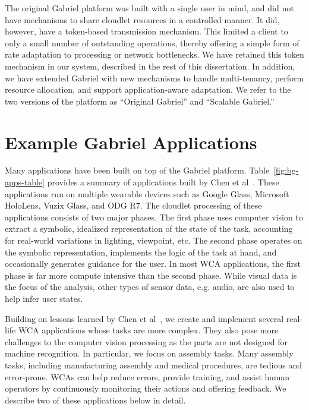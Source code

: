 The original Gabriel platform was built with a single user in mind, and did not
have mechanisms to share cloudlet resources in a controlled manner.  It did,
however, have a token-based transmission mechanism.  This limited a client to
only a small number of outstanding operations, thereby offering a simple form of
rate adaptation to processing or network bottlenecks.  We have retained this
token mechanism in our system, described in the rest of this dissertation. In
addition, we have extended Gabriel with new mechanisms to handle multi-tenancy,
perform resource allocation, and support application-aware adaptation.  We refer
to the two versions of the platform as ``Original Gabriel'' and ``Scalable
Gabriel.''

\section{Example Gabriel Applications}
\label{sec:example-apps}

Many applications have been built on top of the Gabriel platform.
Table~\ref{fig:bg-apps-table} provides a summary of applications built by Chen
et al~\cite{chen2018application}. These applications run on multiple wearable
devices such as Google Glass, Microsoft HoloLens, Vuzix Glass, and ODG R7. The
cloudlet processing of these applications consists of two major phases. The
first phase uses computer vision to extract a symbolic, idealized representation
of the state of the task, accounting for real-world variations in lighting,
viewpoint, etc.  The second phase operates on the symbolic representation,
implements the logic of the task at hand, and occasionally generates guidance
for the user.  In most WCA applications, the first phase is far more compute
intensive than the second phase. While visual data is the focus of the analysis,
other types of sensor data, e.g. audio, are also used to help infer user states.

Building on lessons learned by Chen et al~\cite{chen2018application}, we create
and implement several real-life WCA applications whose tasks are more complex.
They also pose more challenges to the computer vision processing as the parts
are not designed for machine recognition. In particular, we focus on assembly
tasks. Many assembly tasks, including manufacturing assembly and medical
procedures, are tedious and error-prone. WCAs can help reduce errors, provide
training, and assist human operators by continuously monitoring their actions
and offering feedback. We describe two of these applications below in detail.

